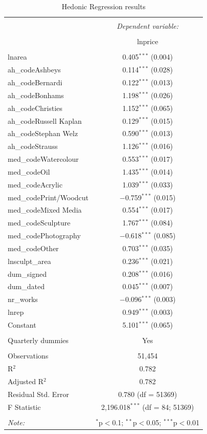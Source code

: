 \documentclass[12pt,]{article}
\begin{document}
\begin{table}[!h] \centering 
  \caption{Hedonic Regression results} 
  \label{} 
\begin{tabular}{@{\extracolsep{5pt}}lc} 
\\[-1.8ex]\hline 
\hline \\[-1.8ex] 
 & \multicolumn{1}{c}{\textit{Dependent variable:}} \\ 
\cline{2-2} 
\\[-1.8ex] & lnprice \\ 
\hline \\[-1.8ex] 
 lnarea & 0.405$^{***}$ (0.004) \\ 
  ah\_codeAshbeys & 0.114$^{***}$ (0.028) \\ 
  ah\_codeBernardi & 0.122$^{***}$ (0.013) \\ 
  ah\_codeBonhams & 1.198$^{***}$ (0.026) \\ 
  ah\_codeChristies & 1.152$^{***}$ (0.065) \\ 
  ah\_codeRussell Kaplan & 0.129$^{***}$ (0.015) \\ 
  ah\_codeStephan Welz & 0.590$^{***}$ (0.013) \\ 
  ah\_codeStrauss & 1.126$^{***}$ (0.016) \\ 
  med\_codeWatercolour & 0.553$^{***}$ (0.017) \\ 
  med\_codeOil & 1.435$^{***}$ (0.014) \\ 
  med\_codeAcrylic & 1.039$^{***}$ (0.033) \\ 
  med\_codePrint/Woodcut & $-$0.759$^{***}$ (0.015) \\ 
  med\_codeMixed Media & 0.554$^{***}$ (0.017) \\ 
  med\_codeSculpture & 1.767$^{***}$ (0.084) \\ 
  med\_codePhotography & $-$0.618$^{***}$ (0.085) \\ 
  med\_codeOther & 0.703$^{***}$ (0.035) \\ 
  lnsculpt\_area & 0.236$^{***}$ (0.021) \\ 
  dum\_signed & 0.208$^{***}$ (0.016) \\ 
  dum\_dated & 0.045$^{***}$ (0.007) \\ 
  nr\_works & $-$0.096$^{***}$ (0.003) \\ 
  lnrep & 0.949$^{***}$ (0.003) \\ 
  Constant & 5.101$^{***}$ (0.065) \\ 
 \hline \\[-1.8ex] 
Quarterly dummies & Yes \\ 
\hline \\[-1.8ex] 
Observations & 51,454 \\ 
R$^{2}$ & 0.782 \\ 
Adjusted R$^{2}$ & 0.782 \\ 
Residual Std. Error & 0.780 (df = 51369) \\ 
F Statistic & 2,196.018$^{***}$ (df = 84; 51369) \\ 
\hline 
\hline \\[-1.8ex] 
\textit{Note:}  & \multicolumn{1}{r}{$^{*}$p$<$0.1; $^{**}$p$<$0.05; $^{***}$p$<$0.01} \\ 
\end{tabular} 
\end{table}
\end{document}

